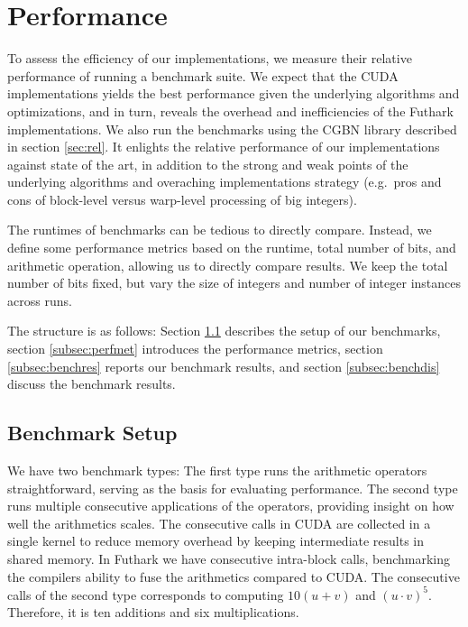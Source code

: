 \section{Performance}
\label{sec:per}

To assess the efficiency of our implementations, we measure their relative
performance of running a benchmark suite. We expect that the CUDA
implementations yields the best performance given the underlying algorithms and
optimizations, and in turn, reveals the overhead and inefficiencies of the
Futhark implementations. We also run the benchmarks using the CGBN library
described in section \ref{sec:rel}. It enlights the relative performance of our
implementations against state of the art, in addition to the strong and weak
points of the underlying algorithms and overaching implementations strategy
(e.g.\ pros and cons of block-level versus warp-level processing of big
integers).

The runtimes of benchmarks can be tedious to directly compare. Instead, we
define some performance metrics based on the runtime, total number of bits, and
arithmetic operation, allowing us to directly compare results. We keep the total
number of bits fixed, but vary the size of integers and number of integer
instances across runs.

The structure is as follows: Section \ref{subsec:benchset} describes the setup
of our benchmarks, section \ref{subsec:perfmet} introduces the performance
metrics, section \ref{subsec:benchres} reports our benchmark results, and
section \ref{subsec:benchdis} discuss the benchmark results.

\subsection{Benchmark Setup}
\label{subsec:benchset}

We have two benchmark types: The first type runs the arithmetic operators
straightforward, serving as the basis for evaluating performance. The second
type runs multiple consecutive applications of the operators, providing insight
on how well the arithmetics scales. The consecutive calls in CUDA are collected
in a single kernel to reduce memory overhead by keeping intermediate results in
shared memory. In Futhark we have consecutive intra-block calls, benchmarking
the compilers ability to fuse the arithmetics compared to CUDA. The consecutive
calls of the second type corresponds to computing $10(u+v)$ and $(u\cdot
v)^5$. Therefore, it is ten additions and six multiplications.

